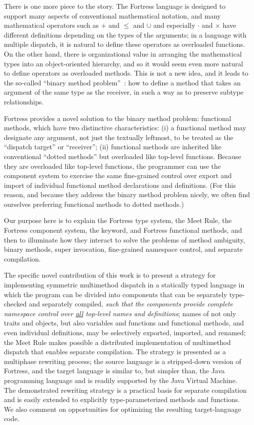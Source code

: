 There is one more piece to the story.  The Fortress language is
designed to support many aspects of conventional mathematical notation,
and many mathematical operators such as $+$ and $\leq$ and $\cup$
and especially $\cdot$ and $\times$
have different definitions depending on the types of the arguments;
in a language with multiple dispatch, 
it is natural to define these operators as overloaded functions.
On the other hand, there is organizational value in arranging the mathematical
types into an object-oriented hierarchy, and so it would seem even more natural
to define operators as overloaded methods.  This is not a new idea,
and it leads to the so-called ``binary method problem''~\cite{BRUCE-ON-BINARY-METHODS}:
how to define a method that takes an argument of the same type
as the receiver, in such a way as to preserve subtype relationships.

Fortress provides a novel solution to the binary method problem: functional
methods, which have two distinctive characteristics: (i) a functional method may
designate any argument, not just the textually leftmost, to be treated as the
``dispatch target'' or ``receiver''; (ii) functional methods are inherited like conventional
``dotted methods'' but overloaded like top-level functions.  Because they are
overloaded like top-level functions, the programmer can use the component system
to exercise the same fine-grained control over export and import of individual
functional method declarations and definitions.  (For this reason, and because
they address the binary method problem nicely, we often find ourselves
preferring functional methods to dotted methods.)

Our purpose here is to explain the Fortress type system, the Meet Rule, the Fortress component system,
the  keyword,
and Fortress functional methods, and then to illuminate how they interact to solve the problems of method ambiguity,
binary methods, super invocation, fine-grained namespace control, and separate compilation.

The specific novel contribution of this work is to present a strategy for implementing symmetric multimethod dispatch
in a statically typed language in which the program can be divided
into components that can be separately type-checked and separately compiled,
{\it such that the components provide complete namespace control over \underline{all} top-level names and definitions};
names of not only traits and objects, but also variables and functions and functional methods, and even individual definitions, may be selectively exported, imported, and renamed;
the Meet Rule makes possible a distributed implementation of multimethod dispatch that enables separate compilation.
The strategy is presented as a multiphase rewriting process; the source language is
a stripped-down version of Fortress, and the target language
is similar to, but simpler than, the Java programming language and is readily
supported by the Java Virtual Machine.  The demonstrated rewriting strategy is
a practical basis for separate compilation and is easily extended to
explicitly type-parameterized methods and functions.
We also comment on opportunities for optimizing the resulting target-language code.



